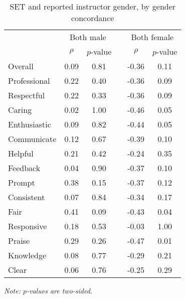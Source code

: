 \documentclass[12pt]{article}
\begin{document}
\begin{table}[htbp]
  \centering
  \footnotesize 
  \caption{SET and reported instructor gender, by gender concordance}
    \begin{tabular}{lccccc}
    \toprule 
          & \multicolumn{2}{c}{Both male}  &  & \multicolumn{2}{c}{Both female} \\
                          & $\rho$  &  $p$-value &  & $\rho$  & $p$-value    \\
                          
   \midrule
    Overall &                0.09       & 0.81 & & -0.36    & 0.11   \\
    Professional &           0.22       & 0.40 & & -0.36    & 0.09   \\
    Respectful			   & 0.22       & 0.33 & & -0.36    & 0.09   \\
    Caring &                 0.02       & 1.00 & & -0.46    & 0.05  \\
    Enthusiastic   &         0.09       & 0.82 & & -0.44    & 0.05   \\
    Communicate        &     0.12       & 0.67 & & -0.39    & 0.10  \\
    Helpful   &              0.21       & 0.42 & & -0.24    & 0.35   \\
    Feedback   &             0.04       & 0.90 & & -0.37    & 0.10   \\
    Prompt    &              0.38       & 0.15 & & -0.37    & 0.12   \\
    Consistent   &           0.07       & 0.84 & & -0.34    & 0.17   \\
    Fair   &                 0.41       & 0.09 & & -0.43    & 0.04  \\
    Responsive   &           0.18       & 0.53 & & -0.03    & 1.00  \\
    Praise    &              0.29       & 0.26 & & -0.47    & 0.01  \\
    Knowledge   &            0.08       & 0.77 & & -0.29    & 0.21  \\
    Clear   &                0.06       & 0.76 & & -0.25    & 0.29  \\
    \bottomrule
    \end{tabular}%
 \label{tab:macnell2}%

  \textit{Note: $p$-values are two-sided.}
\end{table}%
\normalsize
\end{document}
